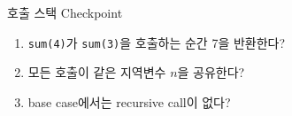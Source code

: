 \begin{frame}{호출 스택 Checkpoint}\begin{enumerate}\item \texttt{sum(4)}가 \texttt{sum(3)}을 호출하는 순간 7을 반환한다?\item 모든 호출이 같은 지역변수 $n$을 공유한다?\item base case에서는 recursive call이 없다?\end{enumerate}
\vfill{}
\end{frame}
